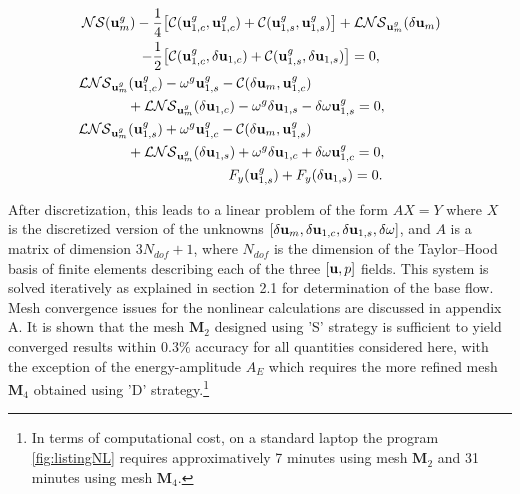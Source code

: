 \documentclass[twocolumn,10pt]{asme2ej}
\begin{document}
\begin{subequations}

\begin{align}
{\cal NS}(  {\bf u }_m^g ) - \frac{1}{4} &\big[ {\cal C}( {\bf u }_{1,c}^g,{\bf u }_{1,c}^g) +  {\cal C}( {\bf u }_{1,s}^g,{\bf u }_{1,s}^g) \big]+ {\cal LNS}_{{\bf u }_m^g}(\delta {\bf u }_m) \nonumber \\
-\frac{1}{2}& \big[ {\cal C}( {\bf u }_{1,c}^g,\delta {\bf u }_{1,c}) +  {\cal C}( {\bf u }_{1,s}^g,\delta {\bf u }_{1,s}) \big] = 0, \label{HB_1} \\
{\cal LNS}_{{\bf u }_m^g}( {\bf u }_{1,c}^g)& - \omega^g {\bf u }_{1,s}^g -  {\cal C}( \delta {\bf u }_{m}, {\bf u }_{1,c}^g) \nonumber \\
&\hspace{-0.9cm}+{\cal LNS}_{{\bf u }_m^g}( \delta {\bf u }_{1,c})  - \omega^g \delta {\bf u }_{1,s}  
 - \delta \omega {\bf u }_{1,s}^g = 0 , \label{HB_2}\\
{\cal LNS}_{{\bf u }_m^g}({\bf u }_{1,s}^g)& + \omega^g {\bf u }_{1,c}^g -  {\cal C}( \delta {\bf u }_{m}, {\bf u }_{1,s}^g) \nonumber \\
&\hspace{-0.9cm}+{\cal LNS}_{{\bf u }_m^g}( \delta {\bf u }_{1,s}) + \omega^g \delta {\bf u }_{1,c} +  \delta \omega {\bf u }_{1,c}^g= 0 , \label{HB_3} \\
&\hspace{1.65cm} F_y({\bf u }_{1,s}^g) + F_y(\delta {\bf u }_{1,s}) = 0. 
\end{align}
\end{subequations}

After discretization, this leads to a linear problem of the form $A X = Y$ where $X$ is the discretized version of the unknowns  $[\delta {\bf u }_m, \delta {\bf u }_{1,c}, \delta {\bf u }_{1,s}, \delta \omega]$, and $A$ is a matrix of dimension $3 N_{dof} +1$, where $N_{dof}$ is the dimension of the Taylor--Hood basis of finite elements describing each of the three $[{\bf u},p]$ fields.
This system is solved iteratively as explained in section 2.1 for determination of the base flow. %
Mesh convergence issues for the nonlinear calculations are discussed in appendix A. It is shown that the mesh $\mathbf{M}_2$ designed using 'S' strategy is sufficient to yield converged results within $0.3\%$ accuracy for all quantities considered here, with the exception of the energy-amplitude $A_E$ which requires the more refined mesh $\mathbf{M}_4$ obtained using 'D' strategy.\footnote{In terms of computational cost, on a standard laptop the program  \ref{fig:listingNL} requires approximatively 7 minutes using  mesh $\mathbf{M}_2$ and 31 minutes using mesh $\mathbf{M}_4$.} 
 
\end{document}
